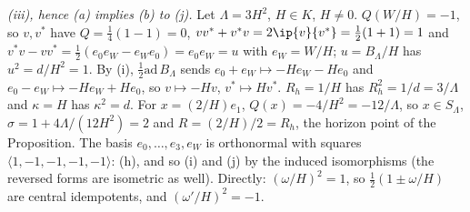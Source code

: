 \emph{(iii), hence (a) implies (b) to (j).} Let $\Lambda = 3H^{2}$, $H \in K$, $H \neq 0$. $Q(W/H) = -1$, so $v, v^{*}$ have $Q = \tfrac14(1 - 1) = 0$, $vv^{*} + v^{*}v = 2\ip{v}{v^{*}} = \tfrac12(1 + 1) = 1$ and $v^{*}v - vv^{*} = \tfrac12(e_{0}e_{W} - e_{W}e_{0}) = e_{0}e_{W} = u$ with $e_{W} = W/H$; $u = B_{\Lambda}/H$ has $u^{2} = d/H^{2} = 1$. By (i), $\tfrac12\mathrm{ad}\,B_{\Lambda}$ sends $e_{0} + e_{W} \mapsto -He_{W} - He_{0}$ and $e_{0} - e_{W} \mapsto -He_{W} + He_{0}$, so $v \mapsto -Hv$, $v^{*} \mapsto Hv^{*}$. $R_{h} = 1/H$ has $R_{h}^{2} = 1/d = 3/\Lambda$ and $\kappa = H$ has $\kappa^{2} = d$. For $x = (2/H)e_{1}$, $Q(x) = -4/H^{2} = -12/\Lambda$, so $x \in S_{\Lambda}$, $\sigma = 1 + 4\Lambda/(12H^{2}) = 2$ and $R = (2/H)/2 = R_{h}$, the horizon point of the Proposition. The basis $e_{0}, \dots, e_{3}, e_{W}$ is orthonormal with squares $\langle 1, -1, -1, -1, -1\rangle$: (h), and so (i) and (j) by the induced isomorphisms (the reversed forms are isometric as well). Directly: $(\omega/H)^{2} = 1$, so $\tfrac12(1 \pm \omega/H)$ are central idempotents, and $(\omega'/H)^{2} = -1$.

